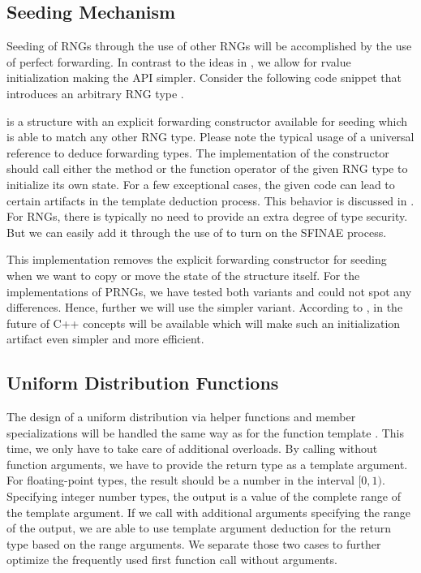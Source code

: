 \documentclass{stdlocal}
\begin{document}
  \subsection{Seeding Mechanism} %
  \label{sub:seeding}
    Seeding of RNGs through the use of other RNGs will be accomplished by the use of perfect forwarding.
    In contrast to the ideas in \textcite{cpp-std-seeding}, we allow for rvalue initialization making the API simpler.
    Consider the following code snippet that introduces an arbitrary RNG type .

     is a structure with an explicit forwarding constructor available for seeding which is able to match any other RNG type.
    Please note the typical usage of a universal reference to deduce forwarding types.
    The implementation of the constructor should call either the  method or the function operator of the given RNG type to initialize its own state.
    For a few exceptional cases, the given code can lead to certain artifacts in the template deduction process.
    This behavior is discussed in \textcite[\ppno~188-197]{meyers2014}.
    For RNGs, there is typically no need to provide an extra degree of type security.
    But we can easily add it through the use of  to turn on the SFINAE process.

    This implementation removes the explicit forwarding constructor for seeding when we want to copy or move the state of the structure itself.
    For the implementations of PRNGs, we have tested both variants and could not spot any differences.
    Hence, further we will use the simpler variant.
    According to \textcite{vandevoorde2018}, in the future of C++ concepts will be available which will make such an initialization artifact even simpler and more efficient.

  \subsection{Uniform Distribution Functions} %
  \label{sub:distributions}
    The design of a uniform distribution  via helper functions and member specializations will be handled the same way as for the function template .
    This time, we only have to take care of additional overloads.
    By calling  without function arguments, we have to provide the return type as a template argument.
    For floating-point types, the result should be a number in the interval $[0,1)$.
    Specifying integer number types, the output is a value of the complete range of the template argument.
    If we call  with additional arguments specifying the range of the output, we are able to use template argument deduction for the return type based on the range arguments.
    We separate those two cases to further optimize the frequently used first function call without arguments.
\end{document}
